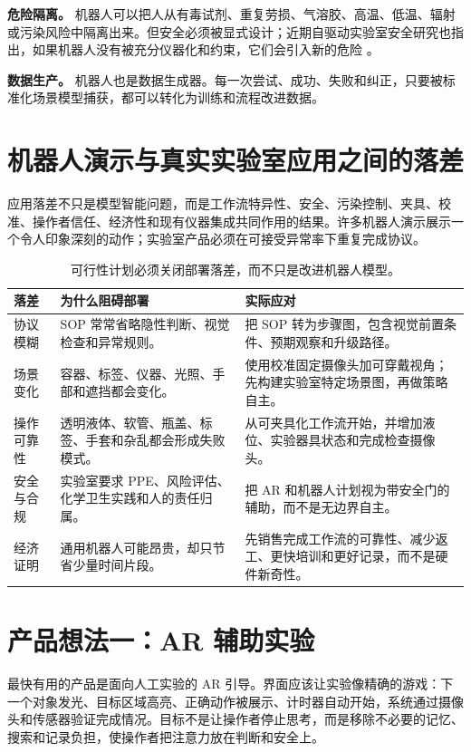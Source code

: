 \documentclass[11pt,fontset=none]{ctexart}
\begin{document}
\textbf{危险隔离。} 机器人可以把人从有毒试剂、重复劳损、气溶胶、高温、低温、辐射或污染风险中隔离出来。但安全必须被显式设计；近期自驱动实验室安全研究也指出，如果机器人没有被充分仪器化和约束，它们会引入新的危险 \cite{sdl2025safety}。

\textbf{数据生产。} 机器人也是数据生成器。每一次尝试、成功、失败和纠正，只要被标准化场景模型捕获，都可以转化为训练和流程改进数据。

\section{机器人演示与真实实验室应用之间的落差}

应用落差不只是模型智能问题，而是工作流特异性、安全、污染控制、夹具、校准、操作者信任、经济性和现有仪器集成共同作用的结果。许多机器人演示展示一个令人印象深刻的动作；实验室产品必须在可接受异常率下重复完成协议。

\begin{table}[htbp]
\centering
\small
\begin{tabularx}{\linewidth}{@{}L{3.0cm}Y Y@{}}
\toprule
\textbf{落差} & \textbf{为什么阻碍部署} & \textbf{实际应对} \\
\midrule
协议模糊 & SOP 常常省略隐性判断、视觉检查和异常规则。 & 把 SOP 转为步骤图，包含视觉前置条件、预期观察和升级路径。 \\
场景变化 & 容器、标签、仪器、光照、手部和遮挡都会变化。 & 使用校准固定摄像头加可穿戴视角；先构建实验室特定场景图，再做策略自主。 \\
操作可靠性 & 透明液体、软管、瓶盖、标签、手套和杂乱都会形成失败模式。 & 从可夹具化工作流开始，并增加液位、实验器具状态和完成检查摄像头。 \\
安全与合规 & 实验室要求 PPE、风险评估、化学卫生实践和人的责任归属。 & 把 AR 和机器人计划视为带安全门的辅助，而不是无边界自主。 \\
经济证明 & 通用机器人可能昂贵，却只节省少量时间片段。 & 先销售完成工作流的可靠性、减少返工、更快培训和更好记录，而不是硬件新奇性。 \\
\bottomrule
\end{tabularx}
\caption{可行性计划必须关闭部署落差，而不只是改进机器人模型。}
\label{tab:application-gap-cn}
\end{table}

\section{产品想法一：AR 辅助实验}

最快有用的产品是面向人工实验的 AR 引导。界面应该让实验像精确的游戏：下一个对象发光、目标区域高亮、正确动作被展示、计时器自动开始，系统通过摄像头和传感器验证完成情况。目标不是让操作者停止思考，而是移除不必要的记忆、搜索和记录负担，使操作者把注意力放在判断和安全上。
\end{document}
